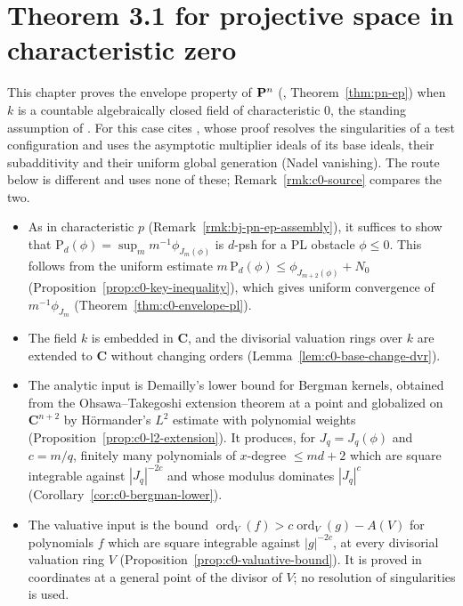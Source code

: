 \section{Theorem 3.1 for projective space in characteristic zero}\label{sec:char0-blueprint}

This chapter proves the envelope property of $\mathbf{P}^n$ (\cite[Theorem~3.1]{FHX}, Theorem~\ref{thm:pn-ep})
when $k$ is a countable algebraically closed field of characteristic $0$, the standing assumption of
\cite[\S5]{FHX}. For this case \cite{FHX} cites \cite[Theorem~5.20]{BJ22}, whose proof resolves the
singularities of a test configuration and uses the asymptotic multiplier ideals of its base ideals,
their subadditivity and their uniform global generation (Nadel vanishing). The route below is
different and uses none of these; Remark~\ref{rmk:c0-source} compares the two.
\begin{itemize}
\item As in characteristic $p$ (Remark~\ref{rmk:bj-pn-ep-assembly}), it suffices to show that
$\mathrm P_d(\phi)=\sup_m m^{-1}\phi_{J_m(\phi)}$ is $d$-psh for a PL obstacle $\phi\le0$. This follows from the
uniform estimate $m\,\mathrm P_d(\phi)\le\phi_{J_{m+2}(\phi)}+N_0$ (Proposition~\ref{prop:c0-key-inequality}),
which gives uniform convergence of $m^{-1}\phi_{J_m}$ (Theorem~\ref{thm:c0-envelope-pl}).
\item The field $k$ is embedded in $\mathbf C$, and the divisorial valuation rings over $k$ are extended to
$\mathbf C$ without changing orders (Lemma~\ref{lem:c0-base-change-dvr}).
\item The analytic input is Demailly's lower bound for Bergman kernels, obtained from the
Ohsawa--Takegoshi extension theorem at a point and globalized on $\mathbf C^{n+2}$ by H\"ormander's
$L^2$ estimate with polynomial weights (Proposition~\ref{prop:c0-l2-extension}). It produces, for
$J_q=J_q(\phi)$ and $c=m/q$, finitely many polynomials of $x$-degree $\le md+2$ which are square
integrable against $|J_q|^{-2c}$ and whose modulus dominates $|J_q|^{c}$
(Corollary~\ref{cor:c0-bergman-lower}).
\item The valuative input is the bound $\operatorname{ord}_V(f)>c\operatorname{ord}_V(g)-A(V)$ for polynomials $f$ which are
square integrable against $|g|^{-2c}$, at every divisorial valuation ring $V$
(Proposition~\ref{prop:c0-valuative-bound}). It is proved in coordinates at a general point of the
divisor of $V$; no resolution of singularities is used.
\end{itemize}

